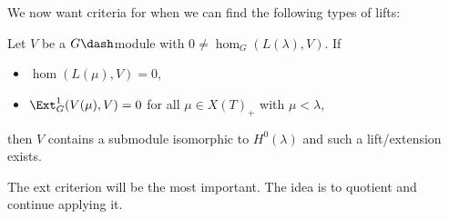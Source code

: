 We now want criteria for when we can find the following types of lifts:

\begin{center}
\end{center}

\begin{lemma}[Important!]

Let \(V\) be a \(G\dash\)module with \(0\neq \hom_G(L(\lambda), V)\). If

\begin{itemize}
\item
  \(\hom(L(\mu), V) = 0\),
\item
  \(\Ext_G^1(V(\mu), V) = 0\) for all \(\mu \in X(T)_+\) with
  \(\mu < \lambda\),
\end{itemize}

then \(V\) contains a submodule isomorphic to \(H^0(\lambda)\) and such
a lift/extension exists.

\end{lemma}

\begin{remark}

The ext criterion will be the most important. The idea is to quotient
and continue applying it.

\end{remark}

